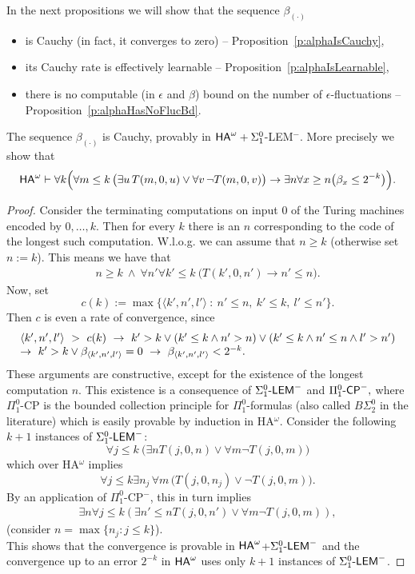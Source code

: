 In the next propositions we will show that the sequence $\beta_{(\cdot)}$
\begin{itemize}
\item is Cauchy (in fact, it converges to zero) -- 
Proposition~\ref{p:alphaIsCauchy},
\item its Cauchy rate is effectively learnable -- Proposition~\ref{p:alphaIsLearnable},
\item there is no computable (in $\epsilon$ and $\beta$) bound on the number of $\epsilon$-fluctuations -- Proposition~\ref{p:alphaHasNoFlucBd}.
\end{itemize}

\begin{prop}\label{p:alphaIsCauchy}
The sequence $\beta_{(\cdot)}$ is Cauchy, provably in 
{\rm ${\textsf{\upshape HA}}^\omega+\Sigma^0_1$-LEM$^-$}. More precisely we show that
\[ 
{\textsf{\upshape HA}}^\omega
\vdash 
\forall k \Big( 
\forall m\leq k \,\big(\exists u\,T(m,0,u) \vee \forall v\,\neg T(m,0,v)\big)\rightarrow \exists n \forall x\geq n\big(\beta_x\leq2^{-k}\big)\Big).
 \]
\end{prop}
\begin{proof}
Consider the terminating computations on input $0$ of the Turing machines encoded by $0,\ldots,k$. Then for every $k$ there is an $n$ corresponding to the
code of the longest such computation. W.l.o.g. we can assume that $n\geq k$ (otherwise set $n:=k$). This means we have that
\begin{align}
n\geq k\ \wedge\ \forall n'\forall k'\leq k\ \big( T(k',0,n')\rightarrow n'\leq n\big).\label{e:ac-n}
\end{align}
Now, set \[ c(k):=\max\{ \langle k',n',l' \rangle\ :\ n'\leq n,\ k'\leq k,\ l'\leq n'\}.\]
Then $c$ is even a rate of convergence, since
\[\ba{l} 
\langle k',n',l'\rangle\ >\ c(k)\ \rightarrow\ k'>k \vee (k'\le k \wedge n'>n)
\vee (k'\le k\wedge n'\le n\wedge l'>n')\\  
\rightarrow\ k'>k \vee \beta_{\langle k',n',l'\rangle}=0 \ \rightarrow\ \beta_{\langle k',n',l'\rangle} < 2^{-k}. \ea 
\]
These arguments are constructive, except for the existence of the longest computation $n$.
This existence is a consequence of $\Sigma^0_1\textsf{\upshape -LEM}^-$ and $\Pi^0_1\textsf{\upshape -}\textsf{\upshape CP}^-,$ where 
$\Pi^0_1$-CP is the bounded collection principle for $\Pi^0_1$-formulas 
(also called $B\Sigma^0_2$ in the literature) which is easily provable by 
induction in HA$^{\omega}$.
Consider the following $k+1$ instances of $\Sigma^0_1\textsf{\upshape -LEM}^-$:
\[ \forall j\leq k\ \big( \exists n T(j,0,n) \vee \forall m \neg T(j,0,m)\big) \] which over HA$^{\omega}$ implies 
\[ \forall j\leq k \exists n_j \,\forall m\,\big( T(j,0,n_j) \vee \neg T(j,0,m)\big). \] 
By an application of $\Pi^0_1$-CP$^-$, this in turn
implies
\begin{align*}
\exists n\forall j\leq k ( \exists n'\leq n T(j,0,n') \vee \forall m \neg T(j,0,m) ),
\end{align*}
 (consider $n=\max \{n_j : j\leq k\}$).\\
This shows that the convergence is provable in ${\textsf{\upshape HA}}^\omega$+$\Sigma^0_1\textsf{\upshape -LEM}^-$ and the convergence up to an error $2^{-k}$ in ${\textsf{\upshape HA}}^\omega$ uses
only $k+1$ instances of $\Sigma^0_1\textsf{\upshape -LEM}^-$.
\end{proof}



